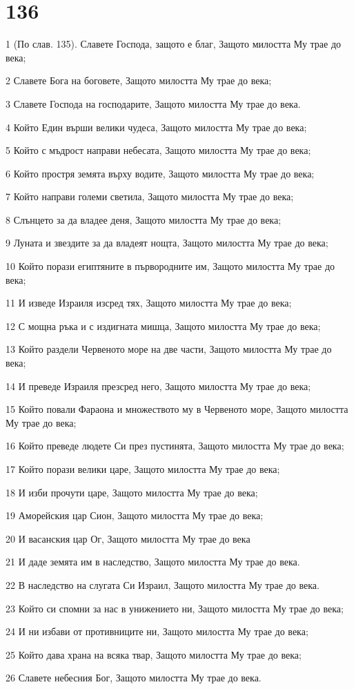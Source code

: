 \chapter{136}

\par 1 (По слав. 135). Славете Господа, защото е благ, Защото милостта Му трае до века;
\par 2 Славете Бога на боговете, Защото милостта Му трае до века;
\par 3 Славете Господа на господарите, Защото милостта Му трае до века.
\par 4 Който Един върши велики чудеса, Защото милостта Му трае до века;
\par 5 Който с мъдрост направи небесата, Защото милостта Му трае до века;
\par 6 Който простря земята върху водите, Защото милостта Му трае до века;
\par 7 Който направи големи светила, Защото милостта Му трае до века;
\par 8 Слънцето за да владее деня, Защото милостта Му трае до века;
\par 9 Луната и звездите за да владеят нощта, Защото милостта Му трае до века;
\par 10 Който порази египтяните в първородните им, Защото милостта Му трае до века;
\par 11 И изведе Израиля изсред тях, Защото милостта Му трае до века;
\par 12 С мощна ръка и с издигната мишца, Защото милостта Му трае до века;
\par 13 Който раздели Червеното море на две части, Защото милостта Му трае до века;
\par 14 И преведе Израиля презсред него, Защото милостта Му трае до века;
\par 15 Който повали Фараона и множеството му в Червеното море, Защото милостта Му трае до века;
\par 16 Който преведе людете Си през пустинята, Защото милостта Му трае до века;
\par 17 Който порази велики царе, Защото милостта Му трае до века;
\par 18 И изби прочути царе, Защото милостта Му трае до века;
\par 19 Аморейския цар Сион, Защото милостта Му трае до века;
\par 20 И васанския цар Ог, Защото милостта Му трае до века
\par 21 И даде земята им в наследство, Защото милостта Му трае до века.
\par 22 В наследство на слугата Си Израил, Защото милостта Му трае до века.
\par 23 Който си спомни за нас в унижението ни, Защото милостта Му трае до века;
\par 24 И ни избави от противниците ни, Защото милостта Му трае до века;
\par 25 Който дава храна на всяка твар, Защото милостта Му трае до века;
\par 26 Славете небесния Бог, Защото милостта Му трае до века.

